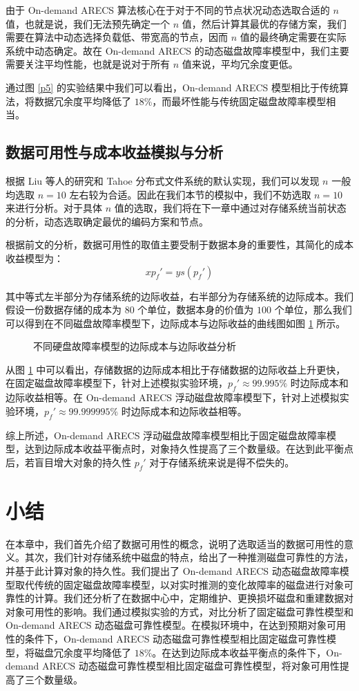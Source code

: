 由于 On-demand ARECS 算法核心在于对于不同的节点状况动态选取合适的 $n$ 值，也就是说，我们无法预先确定一个 $n$ 值，然后计算其最优的存储方案，我们需要在算法中动态选择负载低、带宽高的节点，因而 $n$ 值的最终确定需要在实际系统中动态确定。故在 On-demand ARECS 的动态磁盘故障率模型中，我们主要需要关注平均性能，也就是说对于所有 $n$ 值来说，平均冗余度更低。

通过图 \ref{p5} 的实验结果中我们可以看出，On-demand ARECS 模型相比于传统算法，将数据冗余度平均降低了 $18\%$，而最坏性能与传统固定磁盘故障率模型相当。
\subsection{数据可用性与成本收益模拟与分析}
根据 Liu 等人的研究\cite{liu2018implementation}和 Tahoe 分布式文件系统\cite{wilcox2008tahoe}的默认实现，我们可以发现 $n$ 一般均选取 $n=10$ 左右较为合适。因此在我们本节的模拟中，我们不妨选取 $n=10$ 来进行分析。对于具体 $n$ 值的选取，我们将在下一章中通过对存储系统当前状态的分析，动态选取确定最优的编码方案和节点。

根据前文的分析，数据可用性的取值主要受制于数据本身的重要性，其简化的成本收益模型为：
$$
xp_{f}'=ys(p_{f}')
$$

其中等式左半部分为存储系统的边际收益，右半部分为存储系统的边际成本。我们假设一份数据存储的成本为 $80$ 个单位，数据本身的价值为 $100$ 个单位，那么我们可以得到在不同磁盘故障率模型下，边际成本与边际收益的曲线图如图 \ref{p14} 所示。

\begin{figure}[!htb]
\centering
\resizebox{.8\textwidth}{!}{}
\caption{不同硬盘故障率模型的边际成本与边际收益分析}
\label{p14}
\end{figure}

从图 \ref{p14} 中可以看出，存储数据的边际成本相比于存储数据的边际收益上升更快，在固定磁盘故障率模型下，针对上述模拟实验环境，$p_{f}'\approx99.995\%$ 时边际成本和边际收益相等。在 On-demand ARECS 浮动磁盘故障率模型下，针对上述模拟实验环境，$p_{f}'\approx99.999995\%$ 时边际成本和边际收益相等。

综上所述，On-demand ARECS 浮动磁盘故障率模型相比于固定磁盘故障率模型，达到边际成本收益平衡点时，对象持久性提高了三个数量级。在达到此平衡点后，若盲目增大对象的持久性 $p_{f}'$ 对于存储系统来说是得不偿失的。
\section{小结}
在本章中，我们首先介绍了数据可用性的概念，说明了选取适当的数据可用性的意义。其次，我们针对存储系统中磁盘的特点，给出了一种推测磁盘可靠性的方法，并基于此计算对象的持久性。我们提出了 On-demand ARECS 动态磁盘故障率模型取代传统的固定磁盘故障率模型，以对实时推测的变化故障率的磁盘进行对象可靠性的计算。我们还分析了在数据中心中，定期维护、更换损坏磁盘和重建数据对对象可用性的影响。我们通过模拟实验的方式，对比分析了固定磁盘可靠性模型和 On-demand ARECS 动态磁盘可靠性模型。在模拟环境中，在达到预期对象可用性的条件下，On-demand ARECS 动态磁盘可靠性模型相比固定磁盘可靠性模型，将磁盘冗余度平均降低了 $18\%$。在达到边际成本收益平衡点的条件下，On-demand ARECS 动态磁盘可靠性模型相比固定磁盘可靠性模型，将对象可用性提高了三个数量级。
